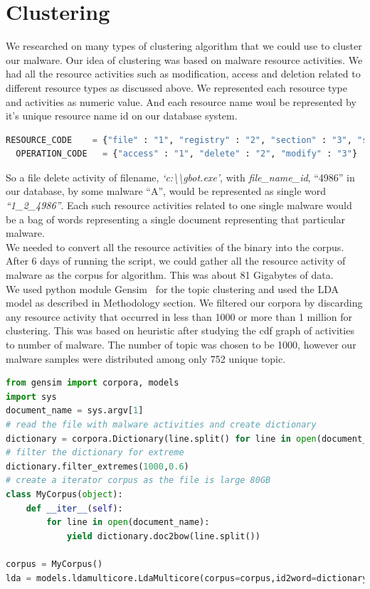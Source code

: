 \section{Clustering}
\label{sec:Clustering}
We researched on many types of clustering algorithm that we could use to cluster our malware. Our idea of clustering was based on malware resource activities.
We had all the resource activities such as modification, access and deletion related to different resource types as discussed above.
We represented each resource type and activities as numeric value. And each resource name woul be represented by it's unique resource name id on our database system.
\begin{lstlisting}[language=python,caption={Numeric codes given to resource and operation},label={lbl:numericode}]
  RESOURCE_CODE    = {"file" : "1", "registry" : "2", "section" : "3", "service" : "4", "driver" : "5", "sync" : "6", "process" : "7", "job" : "8"}
  OPERATION_CODE   = {"access" : "1", "delete" : "2", "modify" : "3"}
\end{lstlisting}
So a file delete activity of filename, \textit{`c:\textbackslash\textbackslash{}gbot.exe'}, with \textit{file\_name\_id}, ``4986'' in our database, by some malware ``A'', would be represented as single word \emph{``1\_2\_4986''}. Each such resource activities related to one single malware would be a bag of words representing  a single document representing that particular malware.\\
We needed to convert all the resource activities of the binary into the corpus. After 6 days of running the script, we could gather all the resource activity of {\gettotalmalwareii} malware as the corpus for algorithm. This was about 81 Gigabytes of data.\\
We used python module Gensim~\cite[Gensim]{gensim}  for the topic clustering and used the LDA model as described in Methodology section. We filtered our corpora by discarding any resource activity that occurred in less than 1000 or more than 1 million for clustering. This was based on heuristic after studying the cdf graph of activities to number of malware.
The number of topic was chosen to be 1000, however our malware samples were distributed among only 752 unique topic.
\begin{lstlisting}[float,floatplacement=H,language=python,caption={Script to run Gensim LDA},label={lbl:lda.py}]
from gensim import corpora, models
import sys
document_name = sys.argv[1]
# read the file with malware activities and create dictionary
dictionary = corpora.Dictionary(line.split() for line in open(document_name))
# filter the dictionary for extreme
dictionary.filter_extremes(1000,0.6)
# create a iterator corpus as the file is large 80GB
class MyCorpus(object):
    def __iter__(self):
        for line in open(document_name):
            yield dictionary.doc2bow(line.split())

corpus = MyCorpus()
lda = models.ldamulticore.LdaMulticore(corpus=corpus,id2word=dictionary,num_topics=1000)
\end{lstlisting}
